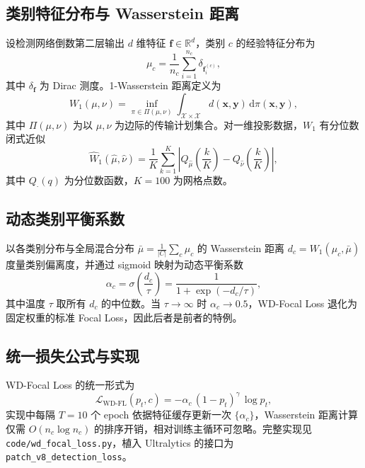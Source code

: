 \subsection{类别特征分布与 Wasserstein 距离}

设检测网络倒数第二层输出 $d$ 维特征 $\bm{f}\in\mathbb{R}^{d}$，类别 $c$ 的经验特征分布为
\begin{equation}
  \mu_c = \frac{1}{n_c}\sum_{i=1}^{n_c}\delta_{\bm{f}_i^{(c)}},
  \label{eq:emp_dist}
\end{equation}
其中 $\delta_{\bm{f}}$ 为 Dirac 测度。1-Wasserstein 距离定义为\cite{villani2009}
\begin{equation}
  W_1(\mu,\nu) = \inf_{\pi\in\Pi(\mu,\nu)}
  \int_{\mathcal{X}\times\mathcal{X}} d(\bm{x},\bm{y})\,\mathrm{d}\pi(\bm{x},\bm{y}),
  \label{eq:w1}
\end{equation}
其中 $\Pi(\mu,\nu)$ 为以 $\mu,\nu$ 为边际的传输计划集合。对一维投影数据，$W_1$ 有分位数闭式近似
\begin{equation}
  \hat{W}_1(\hat{\mu},\hat{\nu}) = \frac{1}{K}\sum_{k=1}^{K}
  \left|Q_{\hat{\mu}}\!\left(\frac{k}{K}\right) - Q_{\hat{\nu}}\!\left(\frac{k}{K}\right)\right|,
  \label{eq:w1_quantile}
\end{equation}
其中 $Q_{\cdot}(q)$ 为分位数函数，$K=100$ 为网格点数。

\subsection{动态类别平衡系数}

以各类别分布与全局混合分布 $\bar{\mu}=\frac{1}{|C|}\sum_{c}\mu_c$ 的 Wasserstein 距离 $d_c = W_1(\mu_c,\bar{\mu})$ 度量类别偏离度，并通过 sigmoid 映射为动态平衡系数
\begin{equation}
  \alpha_c = \sigma\!\left(\frac{d_c}{\tau}\right)
  = \frac{1}{1+\exp(-d_c/\tau)},
  \label{eq:alpha}
\end{equation}
其中温度 $\tau$ 取所有 $d_c$ 的中位数。当 $\tau\to\infty$ 时 $\alpha_c\to0.5$，WD-Focal Loss 退化为固定权重的标准 Focal Loss，因此后者是前者的特例。

\subsection{统一损失公式与实现}

WD-Focal Loss 的统一形式为
\begin{equation}
  \mathcal{L}_{\mathrm{WD\text{-}FL}}(p_t,c)
  = -\alpha_c\,(1-p_t)^{\gamma}\,\log p_t,
  \label{eq:wd_full}
\end{equation}
实现中每隔 $T=10$ 个 epoch 依据特征缓存更新一次 $\{\alpha_c\}$，Wasserstein 距离计算仅需 $O(n_c\log n_c)$ 的排序开销，相对训练主循环可忽略。完整实现见 \texttt{code/wd\_focal\_loss.py}，植入 Ultralytics 的接口为 \texttt{patch\_v8\_detection\_loss}。

